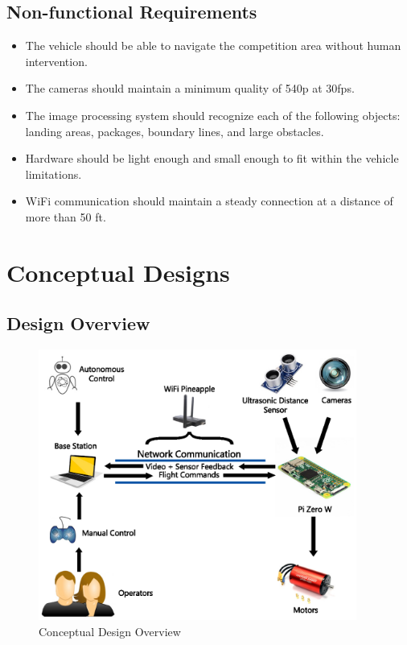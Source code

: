 \documentclass[onecolumn, draftclsnofoot,10pt, compsoc]{IEEEtran}
\begin{document}
\subsection{Non-functional Requirements} 

\begin{itemize}
\item{The vehicle should be able to navigate the competition area without human intervention.}
\item{The cameras should maintain a minimum quality of 540p at 30fps.}
\item{The image processing system should recognize each of the following objects: landing areas, packages, boundary lines, and large obstacles.}
\item{Hardware should be light enough and small enough to fit within the vehicle limitations.}
\item{WiFi communication should maintain a steady connection at a distance of more than 50 ft. }
\end{itemize}



\section{Conceptual Designs}%


\subsection{Design Overview} %

\begin{figure}[ht]
\centering
\includegraphics[height=3.5in]{DesignOverview}
\caption{Conceptual Design Overview}
\end{figure}
\end{document}
